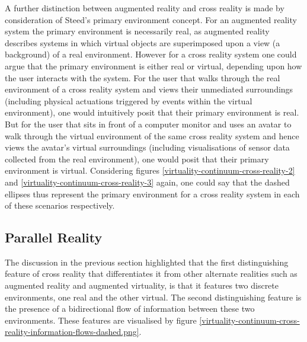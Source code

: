 A further distinction between augmented reality and cross reality is made by consideration of Steed's primary environment concept. For an augmented reality system the primary environment is necessarily real, as augmented reality describes systems in which virtual objects are superimposed upon a view (a background) of a real environment. However for a cross reality system one could argue that the primary environment is either real or virtual, depending upon how the user interacts with the system. For the user that walks through the real environment of a cross reality system and views their unmediated surroundings (including physical actuations triggered by events within the virtual environment), one would intuitively posit that their primary environment is real. But for the user that sits in front of a computer monitor and uses an avatar to walk through the virtual environment of the same cross reality system and hence views the avatar's virtual surroundings (including visualisations of sensor data collected from the real environment), one would posit that their primary environment is virtual. Considering figures \ref{virtuality-continuum-cross-reality-2} and \ref{virtuality-continuum-cross-reality-3} again, one could say that the dashed ellipses thus represent the primary environment for a cross reality system in each of these scenarios respectively.


\subsection{Parallel Reality}

\newcommand{\PRfootnote}{\footnote{Note that the use of `PR' in the quotation in section \ref{subsec_HyperReality} is a reference to `physical reality' (that author's term for what this thesis simply calls `reality') and is not a reference to parallel reality.}}

The discussion in the previous section highlighted that the first distinguishing feature of cross reality that differentiates it from other alternate realities such as augmented reality and augmented virtuality, is that it features two discrete environments, one real and the other virtual. The second distinguishing feature is the presence of a bidirectional flow of information between these two environments. These features are visualised by figure \ref{virtuality-continuum-cross-reality-information-flows-dashed.png}.

